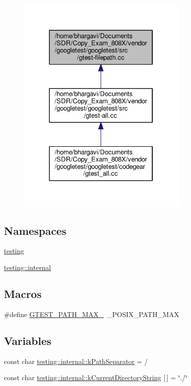 \begin{figure}[H]
\begin{center}
\leavevmode
\includegraphics[width=238pt]{gtest-filepath_8cc__dep__incl}
\end{center}
\end{figure}
\subsection*{Namespaces}
\begin{DoxyCompactItemize}
\item 
 \hyperlink{namespacetesting}{testing}
\item 
 \hyperlink{namespacetesting_1_1internal}{testing\+::internal}
\end{DoxyCompactItemize}
\subsection*{Macros}
\begin{DoxyCompactItemize}
\item 
\#define \hyperlink{gtest-filepath_8cc_ad9d445747785a9271a57cf1d392b89ad}{G\+T\+E\+S\+T\+\_\+\+P\+A\+T\+H\+\_\+\+M\+A\+X\+\_\+}~\+\_\+\+P\+O\+S\+I\+X\+\_\+\+P\+A\+T\+H\+\_\+\+M\+AX
\end{DoxyCompactItemize}
\subsection*{Variables}
\begin{DoxyCompactItemize}
\item 
const char \hyperlink{namespacetesting_1_1internal_afcd71adaa9d1e6df7b282a17fc48125c}{testing\+::internal\+::k\+Path\+Separator} = \textquotesingle{}/\textquotesingle{}
\item 
const char \hyperlink{namespacetesting_1_1internal_a23a8e9527d0e544e7df2d64ad549ce3e}{testing\+::internal\+::k\+Current\+Directory\+String} \mbox{[}$\,$\mbox{]} = \char`\"{}./\char`\"{}
\end{DoxyCompactItemize}


